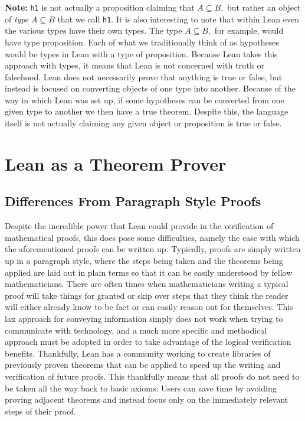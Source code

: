 \documentclass[
  letterpaper,
]{scrreprt}
\theoremstyle{remark}
\begin{document}
\textbf{Note:} \texttt{h1} is not actually a proposition claiming that
\(A \subseteq B,\) but rather an object of \emph{type} \(A \subseteq B\)
that we call \texttt{h1}. It is also interesting to note that within
Lean even the various types have their own types. The type
\(A \subseteq B,\) for example, would have type proposition. Each of
what we traditionally think of as hypotheses would be types in Lean with
a type of proposition. Because Lean takes this approach with types, it
means that Lean is not concerned with truth or falsehood. Lean does not
necessarily prove that anything is true or false, but instead is focused
on converting objects of one type into another. Because of the way in
which Lean was set up, if some hypotheses can be converted from one
given type to another we then have a true theorem. Despite this, the
language itself is not actually claiming any given object or proposition
is true or false.


\hypertarget{lean-as-a-theorem-prover}{%
\chapter{Lean as a Theorem Prover}\label{lean-as-a-theorem-prover}}

\hypertarget{differences-from-paragraph-style-proofs}{%
\section{Differences From Paragraph Style
Proofs}\label{differences-from-paragraph-style-proofs}}

Despite the incredible power that Lean could provide in the verification
of mathematical proofs, this does pose some difficulties, namely the
ease with which the aforementioned proofs can be written up. Typically,
proofs are simply written up in a paragraph style, where the steps being
taken and the theorems being applied are laid out in plain terms so that
it can be easily understood by fellow mathematicians. There are often
times when mathematicians writing a typical proof will take things for
granted or skip over steps that they think the reader will either
already know to be fact or can easily reason out for themselves. This
lax approach for conveying information simply does not work when trying
to communicate with technology, and a much more specific and methodical
approach must be adopted in order to take advantage of the logical
verification benefits. Thankfully, Lean has a community working to
create libraries of previously proven theorems that can be applied to
speed up the writing and verification of future proofs. This thankfully
means that all proofs do not need to be taken all the way back to basic
axioms: Users can save time by avoiding proving adjacent theorems and
instead focus only on the immediately relevant steps of their proof.
\end{document}
